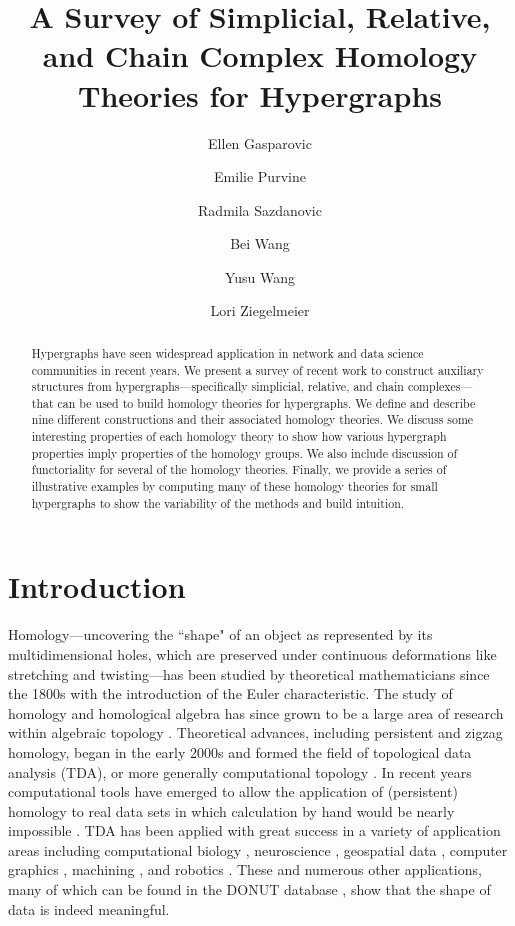 \documentclass{amsart}
\title[A Survey of Homology Theories for Hypergraphs]{A Survey of Simplicial, Relative, and Chain Complex Homology Theories for Hypergraphs}
\author[E. Gasparovic, et al.]{Ellen Gasparovic}
\author[]{Emilie Purvine}
\author[]{Radmila Sazdanovic}
\author[]{Bei Wang}
\author[]{Yusu Wang}
\author[]{Lori Ziegelmeier}
\begin{document}
\begin{abstract}
Hypergraphs have seen widespread application in network and data science communities in recent years. 
We present a survey of recent work to construct auxiliary structures from hypergraphs---specifically simplicial, relative, and chain complexes---that can be used to build homology theories for hypergraphs. We define and describe nine different constructions and their associated homology theories.
We discuss some interesting properties of each homology theory to
show how various hypergraph properties imply properties of the homology groups. We also include discussion of functoriality for several of the homology theories. Finally, we provide a series of illustrative examples by computing many of these homology theories for small hypergraphs to show the variability of the methods and build intuition. 
\end{abstract}

\maketitle

\section{Introduction}
\label{sec:introduction}

Homology---uncovering the ``shape" of an object as represented by its multidimensional holes, which are preserved under continuous deformations like stretching and twisting---has been studied by theoretical mathematicians since the 1800s with the introduction of the Euler characteristic. 
The study of homology and homological algebra has since grown to be a large area of research within algebraic topology \cite{cartan2016homological,Hatcher}.
Theoretical advances, including persistent \cite{EdelsbrunnerLetscherZomorodian2002,zomorodian2005computing} and zigzag \cite{carlsson2010zigzag} homology, began in the early 2000s and formed the field of topological data analysis (TDA), or more generally computational topology \cite{edelsbrunner2010computational,ghrist2014elementary}.
In recent years computational tools have emerged to allow the application of (persistent) homology to real data sets in which calculation by hand would be nearly impossible \cite{otter2017roadmap}. 
TDA has been applied with great success in a variety of application areas including computational biology \cite{bhaskar2023topological,zebrafish, TZH15, wu2017optimal}, neuroscience \cite{anderson2018topological, bendich2016persistent, chung2021reviews, giusti2016two}, geospatial data \cite{feng2021persistent}, computer graphics \cite{pointcloud-topo, singh2007topological}, machining \cite{KHASAWNEH2018195}, and robotics \cite{pathplanning}. These and numerous other applications, many of which can be found in the DONUT database \cite{DONUT}, show that the shape of data is indeed meaningful.
\end{document}
